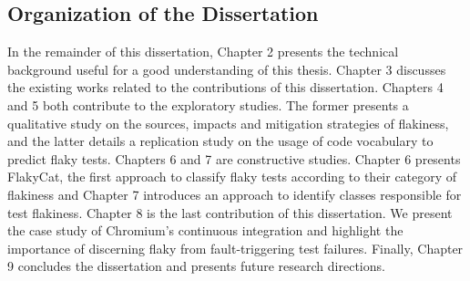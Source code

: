 \subsection{Organization of the Dissertation}

In the remainder of this dissertation, Chapter 2 presents the technical background useful for a good understanding of this thesis. Chapter 3 discusses the existing works related to the contributions of this dissertation. Chapters 4 and 5 both contribute to the exploratory studies. The former presents a qualitative study on the sources, impacts and mitigation strategies of flakiness, and the latter details a replication study on the usage of code vocabulary to predict flaky tests. Chapters 6 and 7 are constructive studies. Chapter 6 presents FlakyCat, the first approach to classify flaky tests according to their category of flakiness and Chapter 7 introduces an approach to identify classes responsible for test flakiness. Chapter 8 is the last contribution of this dissertation. We present the case study of Chromium's continuous integration and highlight the importance of discerning flaky from fault-triggering test failures. Finally, Chapter 9 concludes the dissertation and presents future research directions.
